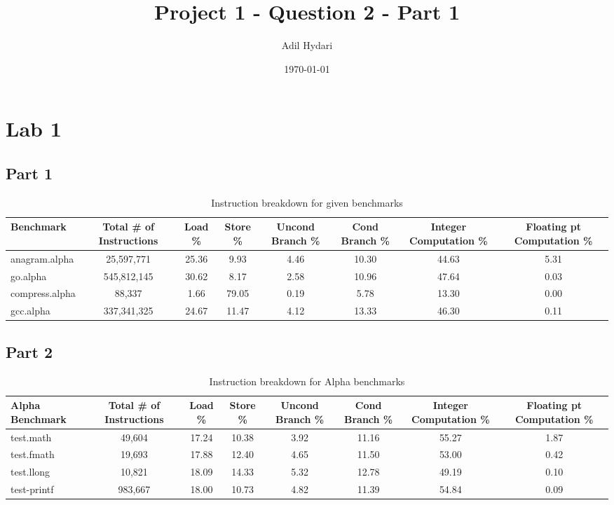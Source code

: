 \documentclass{article}
\title{Project 1 - Question 2 - Part 1}
\author{Adil Hydari}
\date{\today}
\begin{document}
	
	\maketitle
	\section{Lab 1}
	\subsection{Part 1}
	
	\begin{table}[ht]
		\centering
		\begin{adjustbox}{max width=\textwidth}
			\begin{tabular}{|l|c|c|c|c|c|c|c|}
				\hline
				\textbf{Benchmark}      & \textbf{Total \# of Instructions} & \textbf{Load \%} & \textbf{Store \%} & \textbf{Uncond Branch \%} & \textbf{Cond Branch \%} & \textbf{Integer Computation \%} & \textbf{Floating pt Computation \%} \\ \hline
				anagram.alpha           &25,597,771&25.36&9.93&4.46&10.30&44.63&5.31 \\ \hline
				go.alpha                &545,812,145&30.62&8.17&2.58&10.96&47.64&0.03 \\ \hline
				compress.alpha          &88,337&1.66&79.05&0.19&5.78&13.30&0.00      \\ \hline
				gcc.alpha               &337,341,325& 24.67&11.47&4.12&13.33&46.30&0.11 \\ \hline
			\end{tabular}
		\end{adjustbox}
		\caption{Instruction breakdown for given benchmarks}
	\end{table}
	
\subsection{Part 2}
	\begin{table}[ht]
	\centering
	\begin{adjustbox}{max width=\textwidth}
		\begin{tabular}{|l|c|c|c|c|c|c|c|}
			\hline
			\textbf{Alpha Benchmark}      & \textbf{Total \# of Instructions} & \textbf{Load \%} & \textbf{Store \%} & \textbf{Uncond Branch \%} & \textbf{Cond Branch \%} & \textbf{Integer Computation \%} & \textbf{Floating pt Computation \%} \\ \hline
			test.math          &49,604&17.24&10.38&3.92&11.16&55.27&1.87 \\ \hline
			test.fmath                &19,693&17.88&12.40&4.65&11.50&53.00&0.42 \\ \hline
			test.llong          &10,821&18.09&14.33&5.32&12.78&49.19&0.10      \\ \hline
			test-printf               &983,667& 18.00&10.73&4.82&11.39&54.84&0.09 \\ \hline
		\end{tabular}
	\end{adjustbox}
	\caption{Instruction breakdown for Alpha benchmarks}
\end{table}
\end{document}
